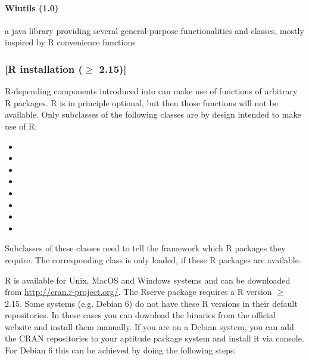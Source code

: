 	\paragraph{Wiutils (1.0)} a java library providing several general-purpose functionalities and classes, mostly inspired by R convenience functions
	\subsubsection{[R installation ($\geq$ 2.15)]}	
	R-depending components introduced into \clusteval can make use of functions of arbitrary R packages. R is in principle optional, but then those functions will not be available. Only subclasses of the following classes are by design intended to make use of R:
	\begin{itemize}
		\item {}
		\item {}
		\item {}
		\item {}
		\item {}
		\item {}
		\item {}
		\item {}
	\end{itemize}
	
	Subclasses of these classes need to tell the framework which R packages they require. The corresponding class is only loaded, if these R packages are available.
	
	R is available for Unix, MacOS and Windows systems and can be downloaded from \url{http://cran.r-project.org/}. The Rserve package requires a R version $\geq$ 2.15. Some systems (e.g. Debian 6) do not have these R versions in their default repositories. In these cases you can download the binaries from the official website and install them manually. If you are on a Debian system, you can add the CRAN repositories to your aptitude package system and install it via console. For Debian 6 this can be achieved by doing the following steps:
	
